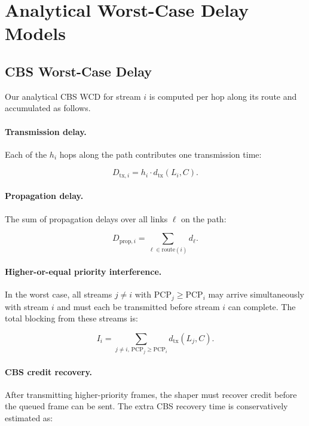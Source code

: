 \section{Analytical Worst-Case Delay Models}
\label{sec:analysis}

\subsection{CBS Worst-Case Delay}

Our analytical CBS WCD for stream $i$ is computed per hop along its route and accumulated as follows.

\paragraph{Transmission delay.}
Each of the $h_i$ hops along the path contributes one transmission time:

\begin{equation}
    D_{\mathrm{tx},i} = h_i \cdot d_{\mathrm{tx}}(L_i, C).
\end{equation}

\paragraph{Propagation delay.}
The sum of propagation delays over all links $\ell$ on the path:

\begin{equation}
    D_{\mathrm{prop},i} = \sum_{\ell \in \mathrm{route}(i)} d_\ell.
\end{equation}

\paragraph{Higher-or-equal priority interference.}
In the worst case, all streams $j \neq i$ with $\mathrm{PCP}_j \geq \mathrm{PCP}_i$ may arrive simultaneously with stream $i$ and must each be transmitted before stream $i$ can complete. The total blocking from these streams is:

\begin{equation}
    I_i = \sum_{j \neq i,\, \mathrm{PCP}_j \geq \mathrm{PCP}_i} d_{\mathrm{tx}}(L_j, C).
\end{equation}

\paragraph{CBS credit recovery.}
After transmitting higher-priority frames, the shaper must recover credit before the queued frame can be sent. The extra CBS recovery time is conservatively estimated as:

